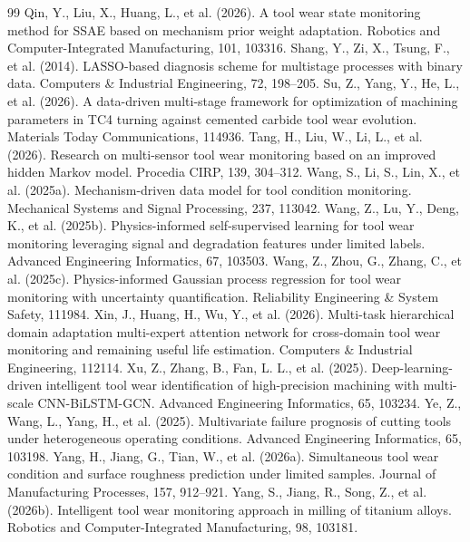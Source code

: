 \documentclass[a4paper,fleqn]{cas-sc}
\begin{document}
\begin{thebibliography}{99}
     Qin, Y., Liu, X., Huang, L., et al. (2026). A tool wear state monitoring method for SSAE based on mechanism prior weight adaptation. Robotics and Computer-Integrated Manufacturing, 101, 103316.
     Shang, Y., Zi, X., Tsung, F., et al. (2014). LASSO-based diagnosis scheme for multistage processes with binary data. Computers \& Industrial Engineering, 72, 198--205.
     Su, Z., Yang, Y., He, L., et al. (2026). A data-driven multi-stage framework for optimization of machining parameters in TC4 turning against cemented carbide tool wear evolution. Materials Today Communications, 114936.
     Tang, H., Liu, W., Li, L., et al. (2026). Research on multi-sensor tool wear monitoring based on an improved hidden Markov model. Procedia CIRP, 139, 304--312.
     Wang, S., Li, S., Lin, X., et al. (2025a). Mechanism-driven data model for tool condition monitoring. Mechanical Systems and Signal Processing, 237, 113042.
     Wang, Z., Lu, Y., Deng, K., et al. (2025b). Physics-informed self-supervised learning for tool wear monitoring leveraging signal and degradation features under limited labels. Advanced Engineering Informatics, 67, 103503.
     Wang, Z., Zhou, G., Zhang, C., et al. (2025c). Physics-informed Gaussian process regression for tool wear monitoring with uncertainty quantification. Reliability Engineering \& System Safety, 111984.
     Xin, J., Huang, H., Wu, Y., et al. (2026). Multi-task hierarchical domain adaptation multi-expert attention network for cross-domain tool wear monitoring and remaining useful life estimation. Computers \& Industrial Engineering, 112114.
     Xu, Z., Zhang, B., Fan, L. L., et al. (2025). Deep-learning-driven intelligent tool wear identification of high-precision machining with multi-scale CNN-BiLSTM-GCN. Advanced Engineering Informatics, 65, 103234.
     Ye, Z., Wang, L., Yang, H., et al. (2025). Multivariate failure prognosis of cutting tools under heterogeneous operating conditions. Advanced Engineering Informatics, 65, 103198.
     Yang, H., Jiang, G., Tian, W., et al. (2026a). Simultaneous tool wear condition and surface roughness prediction under limited samples. Journal of Manufacturing Processes, 157, 912--921.
     Yang, S., Jiang, R., Song, Z., et al. (2026b). Intelligent tool wear monitoring approach in milling of titanium alloys. Robotics and Computer-Integrated Manufacturing, 98, 103181.

\end{thebibliography}
\end{document}
